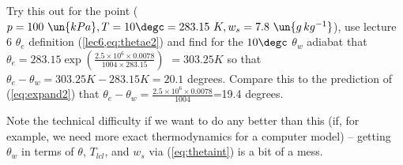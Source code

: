 \documentclass[12pt]{article}
\begin{document}
Try this out for the point ($p=100\ \un{kPa},T=10\degc = 283.15\ K, w_{s}= 7.8\ \un{g\,kg^{-1}}$),
use lecture 6 $\theta_e$ definition (\ref{lec6,eq:thetae2}) and find for the $10\degc$ $\theta_w$
adiabat that
$\theta_e= 283.15 \exp \left ( \frac{2.5 \times 10^6 \times 0.0078}{ 1004 \times 283.15} \right )$
$=303.25K$
so that $\theta_e - \theta_w=303.25 K - 283.15 K =20.1$ degrees.  Compare this to the
prediction of (\ref{eq:expand2}) that 
$\theta_e - \theta_w = \frac{2.5 \times 10^6 \times 0.0078}{ 1004}$=19.4 degrees.

Note the technical difficulty if we want to do any better than this (if, for example,
we need more exact thermodynamics for a computer model) -- getting $\theta_w$ in
terms of $\theta$, $T_{lcl}$, and $w_s$ via (\ref{eq:thetaint}) is a bit of a mess.
\end{document}
